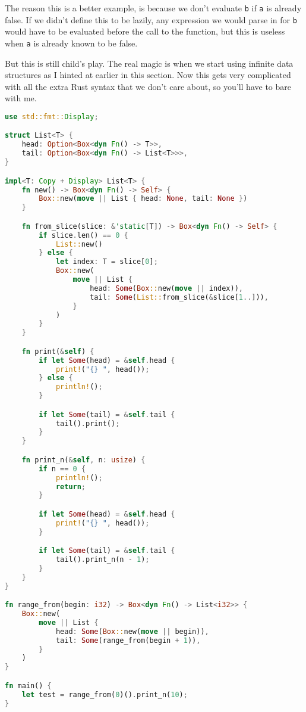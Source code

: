 \documentclass[11pt]{article}
\begin{document}
The reason this is a better example, is because we don't evaluate \texttt{b} if
\texttt{a} is already false. If we didn't define this to be lazily, any
expression we would parse in for \texttt{b} would have to be evaluated before
the call to the function, but this is useless when \texttt{a} is already known
to be false.

But this is still child's play. The real magic is when we start using infinite
data structures as I hinted at earlier in this section. Now this gets very
complicated with all the extra Rust syntax that we don't care about, so you'll
have to bare with me.

\begin{lstlisting}[language=Rust]
use std::fmt::Display;

struct List<T> {
    head: Option<Box<dyn Fn() -> T>>,
    tail: Option<Box<dyn Fn() -> List<T>>>,
}

impl<T: Copy + Display> List<T> {
    fn new() -> Box<dyn Fn() -> Self> {
        Box::new(move || List { head: None, tail: None })
    }

    fn from_slice(slice: &'static[T]) -> Box<dyn Fn() -> Self> {
        if slice.len() == 0 {
            List::new()
        } else {
            let index: T = slice[0];
            Box::new(
                move || List {
                    head: Some(Box::new(move || index)),
                    tail: Some(List::from_slice(&slice[1..])),
                }
            )
        }
    }

    fn print(&self) {
        if let Some(head) = &self.head {
            print!("{} ", head());
        } else {
            println!();
        }

        if let Some(tail) = &self.tail {
            tail().print();
        }
    }

    fn print_n(&self, n: usize) {
        if n == 0 {
            println!();
            return;
        }

        if let Some(head) = &self.head {
            print!("{} ", head());
        }

        if let Some(tail) = &self.tail {
            tail().print_n(n - 1);
        }
    }
}

fn range_from(begin: i32) -> Box<dyn Fn() -> List<i32>> {
    Box::new(
        move || List {
            head: Some(Box::new(move || begin)),
            tail: Some(range_from(begin + 1)),
        }
    )
}

fn main() {
    let test = range_from(0)().print_n(10);
}
\end{lstlisting}
\end{document}
